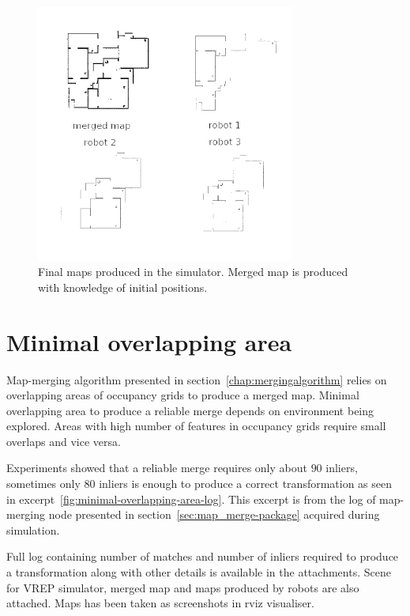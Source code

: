 \begin{figure}
    \centering
    \includegraphics[width=3.35in]{../img/merging-with-known-initial-positions-end.png}
    \caption[Final maps produced in during experiment the simulator.]{Final maps produced in the simulator. Merged map is produced with knowledge of initial positions.}
    \label{fig:merging-with-known-initial-positions-end}
\end{figure}

\section{Minimal overlapping area}
\label{sec:minimal-overlaping-area}

Map-merging algorithm presented in section~\ref{chap:mergingalgorithm} relies on overlapping areas of occupancy grids to produce a merged map. Minimal overlapping area to produce a reliable merge depends on environment being explored. Areas with high number of features in occupancy grids require small overlaps and vice versa.

Experiments showed that a reliable merge requires only about $90$ inliers, sometimes only $80$ inliers is enough to produce a correct transformation as seen in excerpt~\ref{fig:minimal-overlapping-area-log}. This excerpt is from the log of map-merging node presented in section~\ref{sec:map_merge-package} acquired during simulation.

Full log containing number of matches and number of inliers required to produce a transformation along with other details is available in the attachments. Scene for \gls{VREP} simulator, merged map and maps produced by robots are also attached. Maps has been taken as screenshots in rviz visualiser.

